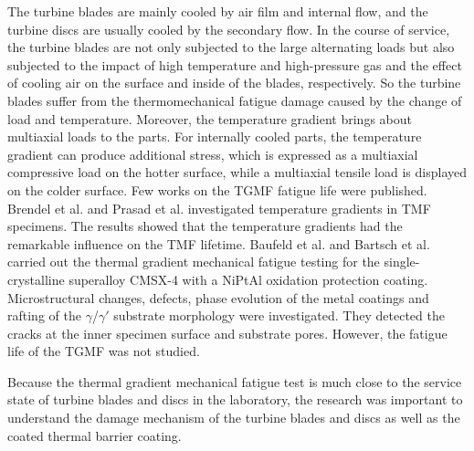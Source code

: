 The turbine blades are mainly cooled by air film and internal flow, and the turbine discs are usually cooled by the secondary flow.
In the course of service, the turbine blades are not only subjected to the large alternating loads but also subjected to the impact of high temperature and high-pressure gas and the effect of cooling air on the surface and inside of the blades, respectively. So the turbine blades suffer from the thermomechanical fatigue damage caused by the change of load and temperature.
Moreover, the temperature gradient brings about multiaxial loads to the parts.
For internally cooled parts, the temperature gradient can produce additional stress, which is expressed as a multiaxial compressive load on the hotter surface, while a multiaxial tensile load is displayed on the colder surface.
Few works on the TGMF fatigue life were published.
Brendel et al. \cite{BRENDEL2008234} and Prasad et al. \cite{PRASAD2013131} investigated temperature gradients in TMF specimens. The results showed that the temperature gradients had the remarkable influence on the TMF lifetime.
Baufeld et al. \cite{BAUFELD2008219} and Bartsch et al. \cite{BARTSCH2008211} carried out the thermal gradient mechanical fatigue testing for the single-crystalline superalloy CMSX-4 with a NiPtAl oxidation protection coating. 
Microstructural changes, defects, phase evolution of the metal coatings and rafting of the $\gamma$/$\gamma'$ substrate morphology were investigated. They detected the cracks at the inner specimen surface and substrate pores. However, the fatigue life of the TGMF was not studied.

Because the thermal gradient mechanical fatigue test is much close to the service state of turbine blades and discs in the laboratory, the research was important to understand the damage mechanism of the turbine blades and discs as well as the coated thermal barrier coating.


